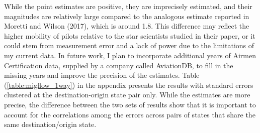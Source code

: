 \documentclass[11pt]{article}
\begin{document}
While the point estimates are positive, they are imprecisely estimated, and their magnitudes are relatively large compared to the analogous estimate reported in Moretti and Wilson (2017), which is around 1.8. This difference may reflect the higher mobility of pilots relative to the star scientists studied in their paper, or it could stem from measurement error and a lack of power due to the limitations of my current data. In future work, I plan to incorporate additional years of Airmen Certification data, supplied by a company called AviationDB, to fill in the missing years and improve the precision of the estimates. Table (\ref{table:migflow_1way}) in the appendix presents the results with standard errors clustered at the destination-origin state pair only. While the estimates are more precise, the difference between the two sets of results show that it is important to account for the correlations among the errors across pairs of states that share the same destination/origin state.
\end{document}
